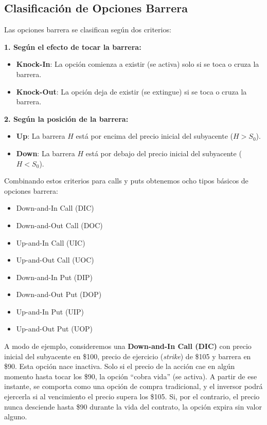 \subsection{Clasificación de Opciones Barrera}

Las opciones barrera se clasifican según dos criterios:

\textbf{1. Según el efecto de tocar la barrera:}
\begin{itemize}
    \item \textbf{Knock-In}: La opción comienza a existir (se activa) solo si se toca o cruza la barrera.
    \item \textbf{Knock-Out}: La opción deja de existir (se extingue) si se toca o cruza la barrera.
\end{itemize}

\textbf{2. Según la posición de la barrera:}
\begin{itemize}
    \item \textbf{Up}: La barrera $H$ está por encima del precio inicial del subyacente ($H > S_0$).
    \item \textbf{Down}: La barrera $H$ está por debajo del precio inicial del subyacente ($H < S_0$).
\end{itemize}

Combinando estos criterios para calls y puts obtenemos ocho tipos básicos de opciones barrera:
\begin{itemize}
    \item Down-and-In Call (DIC)
    \item Down-and-Out Call (DOC)
    \item Up-and-In Call (UIC)
    \item Up-and-Out Call (UOC)
    \item Down-and-In Put (DIP)
    \item Down-and-Out Put (DOP)
    \item Up-and-In Put (UIP)
    \item Up-and-Out Put (UOP)
\end{itemize}

A modo de ejemplo, consideremos una \textbf{Down-and-In Call (DIC)} con precio inicial del subyacente en \$100, precio de ejercicio (\textit{strike}) de \$105 y barrera en \$90. Esta opción nace inactiva. Solo si el precio de la acción cae en algún momento hasta tocar los \$90, la opción ``cobra vida'' (se activa). A partir de ese instante, se comporta como una opción de compra tradicional, y el inversor podrá ejercerla si al vencimiento el precio supera los \$105. Si, por el contrario, el precio nunca desciende hasta \$90 durante la vida del contrato, la opción expira sin valor alguno.

